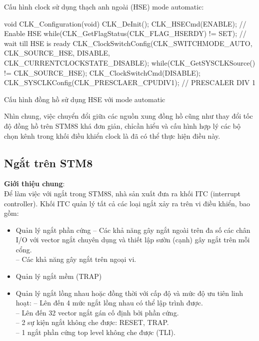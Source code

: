 \pagebreak
Cấu hình clock sử dụng thạch anh ngoài (HSE) mode automatic:
\begin{listing}
\begin{ccode}
void CLK_Configuration(void)
{
    CLK_DeInit();
    CLK_HSECmd(ENABLE); // Enable HSE
    while(CLK_GetFlagStatus(CLK_FLAG_HSERDY) != SET); // wait till HSE is ready
    CLK_ClockSwitchConfig(CLK_SWITCHMODE_AUTO, CLK_SOURCE_HSE, DISABLE, CLK_CURRENTCLOCKSTATE_DISABLE);
    while(CLK_GetSYSCLKSource() != CLK_SOURCE_HSE);
    CLK_ClockSwitchCmd(DISABLE);
    CLK_SYSCLKConfig(CLK_PRESCLAER_CPUDIV1); // PRESCALER DIV 1
}
\end{ccode}
\caption{Cấu hình đồng hồ sử dụng HSE với mode automatic}
\end{listing}

Nhìn chung, việc chuyển đổi giữa các nguồn xung đồng hồ cũng như thay đổi tốc độ đồng hồ trên STM8S khá đơn giản, chỉcần hiểu và cấu hình hợp lý các bộ chọn kênh trong khối điều khiển clock là đã có thể thực hiện điều này.

\subsection{Ngắt trên STM8}
\textbf{Giới thiệu chung}:\\

Để làm việc với ngắt trong STM8S, nhà sản xuất đưa ra khối ITC (interrupt controller).
Khối ITC quản lý tất cả các loại ngắt xảy ra trên vi điều khiển, bao gồm:
\begin{itemize}
\item Quản lý ngắt phần cứng
    -- Các khả năng gây ngắt ngoài trên đa số các chân I/O với vector ngắt chuyên dụng và thiết lập sườn (cạnh) gây ngắt trên mỗi cổng.\\
    -- Các khả năng gây ngắt trên ngoại vi.
\item Quản lý ngắt mềm (TRAP)
\item Quản lý ngắt lồng nhau hoặc đồng thời với cấp độ và mức độ ưu tiên linh hoạt:
    -- Lên đến 4 mức ngắt lồng nhau có thể lập trình được.\\
    -- Lên đến 32 vector ngắt gán cố định bởi phần cứng.\\
    -- 2 sự kiện ngắt không che được: RESET, TRAP.\\
    -- 1 ngắt phần cứng top level không che được (TLI).
\end{itemize}

